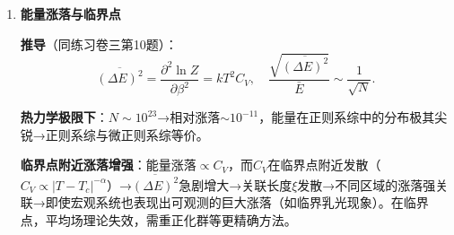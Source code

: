 \documentclass[12pt,a4paper,fontset=mac]{ctexart}
\newcommand{\đ}{\mathrm{đ}}
\begin{document}
\begin{enumerate}
系统处于特定$(N,s)$态的概率正比于$\Omega_R$：
\[P(N,s)\propto\Omega_R(E_0-E, N_0-N)=e^{S_R(E_0-E, N_0-N)/k}.\]

将$S_R$在$(E_0,N_0)$附近展开到一阶：
\[S_R(E_0-E, N_0-N)\approx S_R(E_0,N_0)-\left(\frac{\partial S_R}{\partial E}\right)_{N,V}E-\left(\frac{\partial S_R}{\partial N}\right)_{E,V}N.\]
由热力学关系：$\left(\frac{\partial S}{\partial E}\right)_{N,V}=\frac{1}{T}$，$\left(\frac{\partial S}{\partial N}\right)_{E,V}=-\frac{\mu}{T}$。

\[\therefore P(N,s)\propto\exp\left(-\frac{E}{kT}+\frac{\mu N}{kT}\right)=e^{-\alpha N-\beta E_s}.\]

归一化：$\rho_{N,s}=\frac{1}{\Xi}e^{-\alpha N-\beta E_s}$，$\Xi=\sum_{N,s}e^{-\alpha N-\beta E_s}$为巨配分函数。

$\alpha=-\mu/kT$反映了系统的化学势，$\beta=1/kT$反映了温度。

\item \textbf{能量涨落与临界点}

\textbf{推导}（同练习卷三第10题）：
\[\overline{(\Delta E)^2}=\frac{\partial^2\ln Z}{\partial\beta^2}=kT^2C_V,\quad\frac{\sqrt{\overline{(\Delta E)^2}}}{\bar{E}}\sim\frac{1}{\sqrt{N}}.\]

\textbf{热力学极限下}：$N\sim10^{23}$→相对涨落$\sim10^{-11}$，能量在正则系综中的分布极其尖锐→正则系综与微正则系综等价。

\textbf{临界点附近涨落增强}：能量涨落$\propto C_V$，而$C_V$在临界点附近发散（$C_V\propto|T-T_c|^{-\alpha}$）→$\overline{(\Delta E)^2}$急剧增大→关联长度$\xi$发散→不同区域的涨落强关联→即使宏观系统也表现出可观测的巨大涨落（如临界乳光现象）。在临界点，平均场理论失效，需重正化群等更精确方法。

\end{enumerate}
\end{document}
